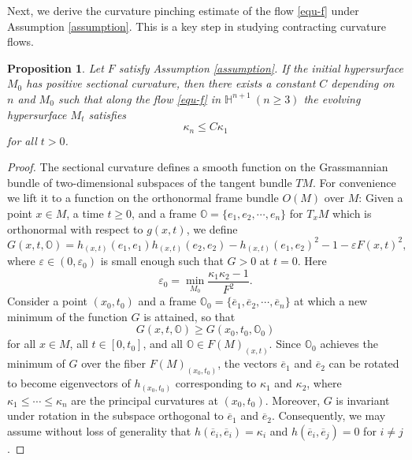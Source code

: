 \documentclass[11pt,reqno]{amsart}
\newtheorem{proposition}{Proposition}[section]
\theoremstyle{remark}
\numberwithin{equation}{section}
\begin{document}
Next, we derive the curvature pinching estimate of the flow \eqref{equ-f} under Assumption \ref{assumption}. This is a key step in studying contracting curvature flows. 
\begin{proposition}\label{s4.lem-pinc}
	Let $F$ satisfy Assumption \ref{assumption}. If the initial hypersurface $M_0$ has positive sectional curvature, then there exists a constant $C$ depending on $n$ and $M_0$ such that along the flow \eqref{equ-f} in $\mathbb{H}^{n+1}\ (n\geq 3)$ the evolving hypersurface $M_t$ satisfies
	\begin{equation}
		\label{equ-pinching}
		\kappa_n \leq C \kappa_1
	\end{equation}
    for all $t>0$.
\end{proposition}
\begin{proof}
	The sectional curvature defines a smooth function on the Grassmannian bundle of two-dimensional subspaces of the tangent bundle $TM$. For convenience we lift it to a function on the orthonormal frame bundle $O(M)$ over $M$: Given a point $x\in M$, a time $t\geq 0$, and a frame $\mathbb{O}=\{e_1,e_2,\cdots,e_n\}$ for $T_x M$ which is orthonormal with respect to $g(x,t)$, we define
	\begin{equation*}
		G(x,t,\mathbb{O}) = h_{(x,t)}(e_1,e_1)h_{(x,t)}(e_2,e_2) - h_{(x,t)}(e_1,e_2)^2 - 1- \varepsilon F(x,t)^2,
	\end{equation*}
    where $\varepsilon\in(0,\varepsilon_0)$ is small enough such that $G>0$ at $t=0$. Here
    \begin{equation*}
    	\varepsilon_0 = \min\limits_{M_0}\dfrac{\kappa_1\kappa_2-1}{F^2}.
    \end{equation*}
    Consider a point $(x_0,t_0)$ and a frame $\mathbb{O}_0=\{\overline{e}_1,\overline{e}_2,\cdots,\overline{e}_n\}$ at which a new minimum of the function $G$ is attained, so that $$G(x,t,\mathbb{O})\geq G(x_0,t_0,\mathbb{O}_0)$$
    for all $x\in M$, all $t\in [0,t_0]$, and all $\mathbb{O}\in F(M)_{(x,t)}$. Since $\mathbb{O}_0$ achieves the minimum of $G$ over the fiber $F(M)_{(x_0,t_0)}$, the vectors $\overline{e}_1$ and $\overline{e}_2$ can be rotated to become eigenvectors of $h_{(x_0,t_0)}$ corresponding to $\kappa_1$ and $\kappa_2$, where $\kappa_1\leq\cdots\leq \kappa_n$ are the principal curvatures at $(x_0,t_0)$. Moreover, $G$ is invariant under rotation in the subspace orthogonal to $\overline{e}_1$ and $\overline{e}_2$. Consequently, we may assume without loss of generality that $h(\overline{e}_i,\overline{e}_i)=\kappa_i$ and $h(\overline{e}_i,\overline{e}_j)=0$ for $i\neq j$.
    

\end{proof}
\end{document}
